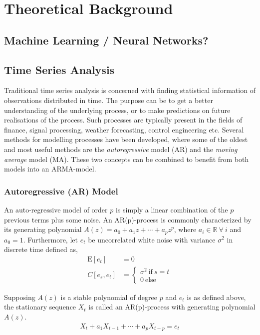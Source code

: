 \chapter{Theoretical Background}
\section{Machine Learning / Neural Networks?}

\section{Time Series Analysis}

Traditional time series analysis is concerned with finding statistical information of observations distributed in time. The purpose can be to get a better understanding of the underlying process, or to make predictions on future realisations of the process. Such processes are typically present in the fields of finance, signal processing, weather forecasting, control engineering etc. Several methods for modelling processes have been developed, where some of the oldest and most useful methods are the \textit{autoregressive} model (AR) and the \textit{moving average} model (MA). These two concepts can be combined to benefit from both models into an ARMA-model.

\subsection{Autoregressive (AR) Model}
An auto-regressive model of order $p$ is simply a linear combination of the $p$ previous terms plus some noise. An AR(p)-process is commonly characterized by its generating polynomial $A(z) = a_0 + a_1z + \cdots + a_pz^p$, where $a_i \in \mathbb{R} \ \forall \ i$ and $a_0=1$. Furthermore, let $e_t$ be uncorrelated white noise with variance $\sigma^2$ in discrete time defined as, 
\begin{align}
    \text{E}[e_t] &= 0 \\
    C[e_s, e_t] &= \begin{cases}
    \sigma^2 \ \text{if} \ s=t \\
    0 \ \text{else}
    \end{cases}
\end{align}

Supposing $A(z)$ is a stable polynomial of degree $p$ and $e_t$ is as defined above, the stationary sequence $X_t$ is called an AR(p)-process with generating polynomial $A(z)$. 
\begin{align}
    X_t + a_1 X_{t-1} + \cdots + a_p X_{t-p} = e_t
\end{align}

